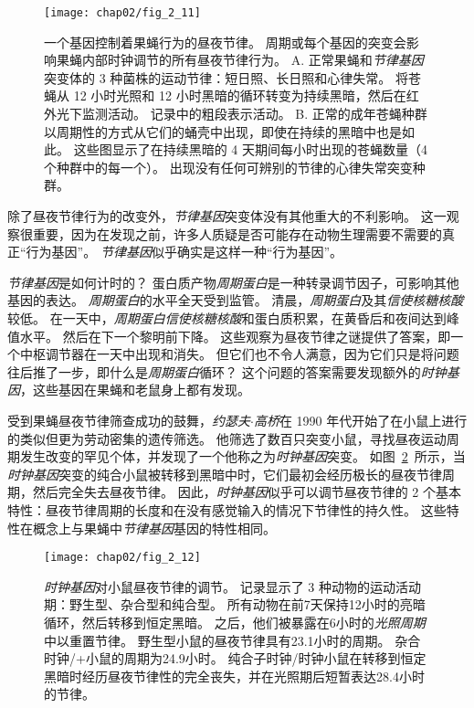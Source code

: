 \begin{figure}[htbp]
	\centering
	\texttt{[image: chap02/fig\_2\_11]}
	\caption{一个基因控制着果蝇行为的昼夜节律。
		周期或每个基因的突变会影响果蝇内部时钟调节的所有昼夜节律行为\cite{konopka1971clock}。
		A. 正常果蝇和\textit{节律基因}突变体的 3 种菌株的运动节律：短日照、长日照和心律失常。
		将苍蝇从 12 小时光照和 12 小时黑暗的循环转变为持续黑暗，然后在红外光下监测活动。
		记录中的粗段表示活动。
		B. 正常的成年苍蝇种群以周期性的方式从它们的蛹壳中出现，即使在持续的黑暗中也是如此。
		这些图显示了在持续黑暗的 4 天期间每小时出现的苍蝇数量（4 个种群中的每一个）。
		出现没有任何可辨别的节律的心律失常突变种群。}
	\label{fig:2_11}
\end{figure}


除了昼夜节律行为的改变外，\textit{节律基因}突变体没有其他重大的不利影响。
这一观察很重要，因为在发现之前，许多人质疑是否可能存在动物生理需要不需要的真正“行为基因”。
\textit{节律基因}似乎确实是这样一种“行为基因”。


\textit{节律基因}是如何计时的？
蛋白质产物\textit{周期蛋白}是一种转录调节因子，可影响其他基因的表达。
\textit{周期蛋白}的水平全天受到监管。
清晨，\textit{周期蛋白}及其\textit{信使核糖核酸}较低。
在一天中，\textit{周期蛋白}\textit{信使核糖核酸}和蛋白质积累，在黄昏后和夜间达到峰值水平。
然后在下一个黎明前下降。
这些观察为昼夜节律之谜提供了答案，即一个中枢调节器在一天中出现和消失。
但它们也不令人满意，因为它们只是将问题往后推了一步，即什么是\textit{周期蛋白}循环？
这个问题的答案需要发现额外的\textit{时钟基因}，这些基因在果蝇和老鼠身上都有发现。



受到果蝇昼夜节律筛查成功的鼓舞，\textit{约瑟夫$\cdot$高桥}在 1990 年代开始了在小鼠上进行的类似但更为劳动密集的遗传筛选。
他筛选了数百只突变小鼠，寻找昼夜运动周期发生改变的罕见个体，并发现了一个他称之为\textit{时钟基因}突变。
如图~\ref{fig:2_12}~所示，当\textit{时钟基因}突变的纯合小鼠被转移到黑暗中时，它们最初会经历极长的昼夜节律周期，然后完全失去昼夜节律。
因此，\textit{时钟基因}似乎可以调节昼夜节律的 2 个基本特性：昼夜节律周期的长度和在没有感觉输入的情况下节律性的持久性。
这些特性在概念上与果蝇中\textit{节律基因}基因的特性相同。




\begin{figure}[htbp]
	\centering
	\texttt{[image: chap02/fig\_2\_12]}
	\caption{\textit{时钟基因}对小鼠昼夜节律的调节。
		记录显示了 3 种动物的运动活动期：野生型、杂合型和纯合型。
		所有动物在前7天保持12小时的亮暗循环，然后转移到恒定黑暗。
		之后，他们被暴露在6小时的\textit{光照周期}中以重置节律。
		野生型小鼠的昼夜节律具有23.1小时的周期。
		杂合时钟/+小鼠的周期为24.9小时。
		纯合子时钟/时钟小鼠在转移到恒定黑暗时经历昼夜节律性的完全丧失，并在光照期后短暂表达28.4小时的节律\cite{takahashi1994forward}。}
	\label{fig:2_12}
\end{figure}


